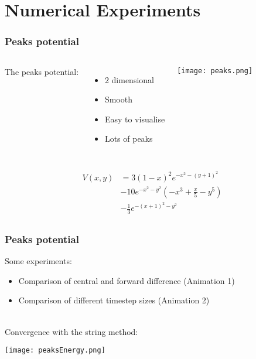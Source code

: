 \documentclass{beamer}
\renewcommand{\(}{\left(}
\renewcommand{\)}{\right)}
\begin{document}
\section{Numerical Experiments}
\begin{frame}
\frametitle{Peaks potential}
\vspace{-1em}
\begin{columns}[c]

The peaks potential:
\begin{itemize}
\item 2 dimensional
\item Smooth
\item Easy to visualise
\item Lots of peaks
\end{itemize}

\begin{center}
\texttt{[image: peaks.png]}
\end{center}
\end{columns}

\begin{align*}
V(x,y) & = 3 (1-x)^2 e^{-x^2-(y+1)^2}\\
&-10 e^{-x^2-y^2} \left(-x^3+\frac{x}{5}-y^5\right)\\
&-\frac{1}{3} e^{-(x+1)^2-y^2}\\
\end{align*}
\end{frame}

\begin{frame}
\frametitle{Peaks potential}
Some experiments:
\begin{itemize}
\item Comparison of central and forward difference (Animation 1)
\item Comparison of different timestep sizes (Animation 2)
\end{itemize}
~\\
Convergence with the string method:
\begin{center}
\texttt{[image: peaksEnergy.png]}
\end{center}

\end{frame}
\end{document}

